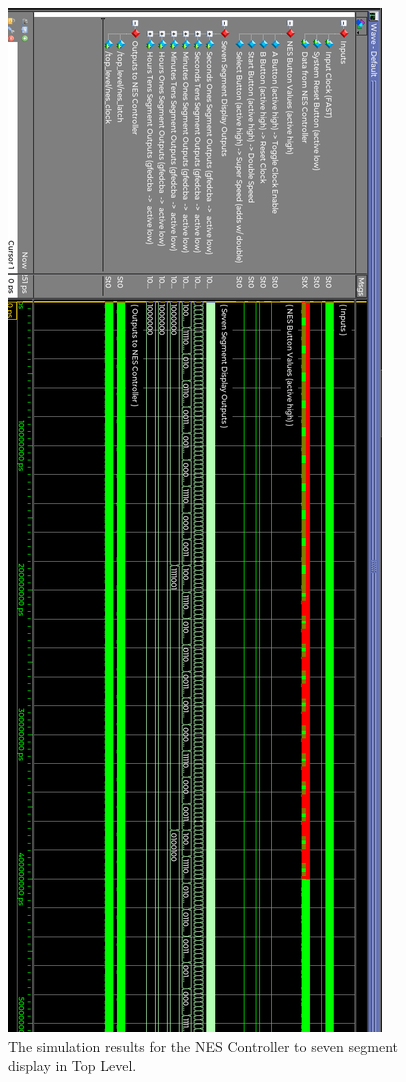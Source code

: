 \documentclass[a4paper]{article}
\begin{document}
\begin{figure}[h]
  \centering
    \includegraphics[height=0.98\textheight]{sims/top_level_clock_sim_2.png}
	\caption{The simulation results for the NES Controller to seven segment display in Top Level.}
    \label{fig:top-level-sim}
\end{figure}
\end{document}
